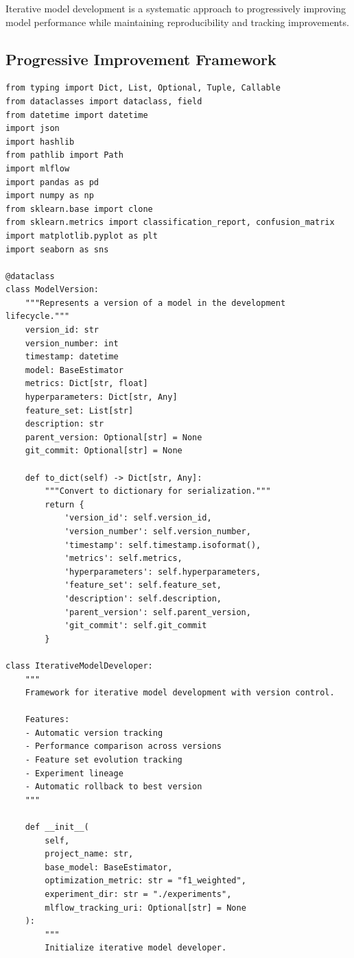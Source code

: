 Iterative model development is a systematic approach to progressively improving model performance while maintaining reproducibility and tracking improvements.

\subsection{Progressive Improvement Framework}

\begin{lstlisting}[style=python, caption={Iterative Model Development Framework}]
from typing import Dict, List, Optional, Tuple, Callable
from dataclasses import dataclass, field
from datetime import datetime
import json
import hashlib
from pathlib import Path
import mlflow
import pandas as pd
import numpy as np
from sklearn.base import clone
from sklearn.metrics import classification_report, confusion_matrix
import matplotlib.pyplot as plt
import seaborn as sns

@dataclass
class ModelVersion:
    """Represents a version of a model in the development lifecycle."""
    version_id: str
    version_number: int
    timestamp: datetime
    model: BaseEstimator
    metrics: Dict[str, float]
    hyperparameters: Dict[str, Any]
    feature_set: List[str]
    description: str
    parent_version: Optional[str] = None
    git_commit: Optional[str] = None

    def to_dict(self) -> Dict[str, Any]:
        """Convert to dictionary for serialization."""
        return {
            'version_id': self.version_id,
            'version_number': self.version_number,
            'timestamp': self.timestamp.isoformat(),
            'metrics': self.metrics,
            'hyperparameters': self.hyperparameters,
            'feature_set': self.feature_set,
            'description': self.description,
            'parent_version': self.parent_version,
            'git_commit': self.git_commit
        }

class IterativeModelDeveloper:
    """
    Framework for iterative model development with version control.

    Features:
    - Automatic version tracking
    - Performance comparison across versions
    - Feature set evolution tracking
    - Experiment lineage
    - Automatic rollback to best version
    """

    def __init__(
        self,
        project_name: str,
        base_model: BaseEstimator,
        optimization_metric: str = "f1_weighted",
        experiment_dir: str = "./experiments",
        mlflow_tracking_uri: Optional[str] = None
    ):
        """
        Initialize iterative model developer.


\end{lstlisting}
